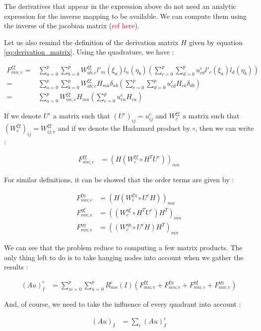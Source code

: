 The derivatives that appear in the expression above do not need an analytic expression for the inverse mapping to be available. We can compute them using the inverse of the jacobian matrix (\textcolor{red}{ref here}).

Let us also remind the definition of the derivation matrix $H$ given by equation \ref{eq:derivation_matrix}. Using the quadrature, we have : 

\begin{align*}
F^{\xi\xi}_{mn;e} =& \sum_{a=0}^p\sum_{b=0}^p W^{\xi\xi}_{ab;e} l'_m(\xi_a)l_n(\eta_b)\left( \sum_{c=0}^p\sum_{d=0}^p u^e_{cd}l'_c(\xi_a)l_d(\eta_b)\right) \\
=& \sum_{a=0}^p\sum_{b=0}^p W^{\xi\xi}_{ab;e} H_{ma} \delta_{nb} \left( \sum_{c=0}^p\sum_{d=0}^p u^e_{cd}H_{ca}\delta_{db}\right) \\
=& \sum_{a=0}^p W_{an;e}^{\xi\xi}H_{ma}\left(\sum_{c=0}^p u^e_{cn}H_{ca}\right)
\end{align*}

If we denote $U^e$ a matrix such that $(U^e)_{ij} = u^e_{ij}$ and $W^{\xi\xi}_e$ a matrix such that $(W^{\xi\xi}_e)_{ij} = W^{\xi\xi}_{ij;e}$ and if we denote the Hadamard product by $\circ$,  then we can write : 

\begin{align*}
F^{\xi\xi}_{mn;e} &= \left( H(W_e^{\xi\xi} \circ H^TU^e)\right)_{mn}
\end{align*}

For similar definitions, it can be showed that the order terms are given by :  

\begin{align*}
F^{\xi\eta}_{mn;e} &= \left( H(W_e^{\xi\eta} \circ U^eH)\right)_{mn}\\
F^{\eta\xi}_{mn;e} &= \left( (W_e^{\eta\xi} \circ H^TU^e)H^T\right)_{mn}\\
F^{\eta\eta}_{mn;e} &= \left( (W_e^{\eta\eta} \circ U^eH)H^T\right)_{mn}
\end{align*}

We can see that the problem reduce to computing a few matrix products. The only thing left to do is to take hanging nodes into account when we gather the results : 

\begin{align*}
(Au)^e_I &= \sum_{m=0}^p\sum_{n=0}^p R^e_{mn}(I) \left(F_{mn;e}^{\xi\xi}+F_{mn;e}^{\xi\eta}+F_{mn;e}^{\eta\xi}+F_{mn;e}^{\eta\eta} \right)
\end{align*}

And, of course, we need to take the influence of every quadrant into account : 

\begin{align*}
(Au)_I &= \sum_e (Au)_I^e
\end{align*}



